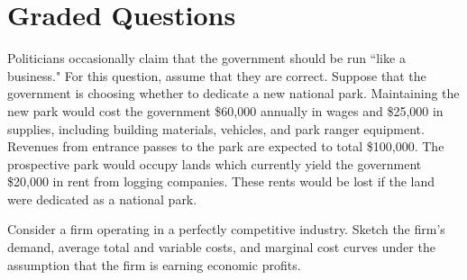 \documentclass{exam}
\begin{document}
\section{Graded Questions}

\begin{questions}

\question Politicians occasionally claim that the government should be run ``like a business." For this question, assume that they are correct. Suppose that the government is choosing whether to dedicate a new national park. Maintaining the new park would cost the government \$60,000 annually in wages and \$25,000 in supplies, including building materials, vehicles, and park ranger equipment. Revenues from entrance passes to the park are expected to total \$100,000. The prospective park would occupy lands which currently yield the government \$20,000 in rent from logging companies. These rents would be lost if the land were dedicated as a national park.




\question Consider a firm operating in a perfectly competitive industry. Sketch the firm's demand, average total and variable costs, and marginal cost curves under the assumption that the firm is earning economic profits.

\begin{parts}

\end{parts}
\end{questions}
\end{document}
